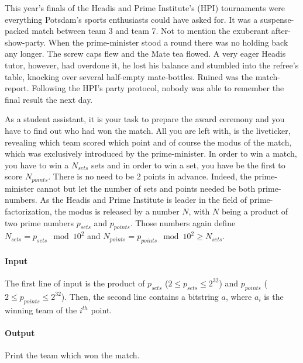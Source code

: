 



\makeheader

This year's finals of the Headis and Prime Institute's (HPI) tournaments were everything Potsdam's sports enthusiasts could have asked for.
It was a suspense-packed match between team 3 and team 7.
Not to mention the exuberant after-show-party.
When the prime-minister stood a round there was no holding back any longer.
The screw caps flew and the Mate tea flowed.
A very eager Headis tutor, however, had overdone it, he lost his balance and stumbled into the refree's table, knocking over several half-empty mate-bottles.
Ruined was the match-report.
Following the HPI's party protocol, nobody was able to remember the final result the next day.

As a student assistant, it is your task to prepare the award ceremony and you have to find out who had won the match.
All you are left with, is the liveticker, revealing which team scored which point and of course the modus of the match,
which was exclusively introduced by the prime-minister.
In order to win a match, you have to win a $N_{sets}$ sets and in order to win a set, you have be the first to score $N_{points}$.
There is no need to be 2 points in advance.
Indeed, the prime-minister cannot but let the number of sets and points needed be both prime-numbers.
As the Headis and Prime Institute is leader in the field of prime-factorization, the modus is released by a number $N$,
with $N$ being a product of two prime numbers $p_{sets}$ and $p_{points}$. Those numbers again define $N_{sets} =
p_{sets} \mod 10^{2}$ and $N_{points} = p_{points} \mod 10^{2} \geq N_{sets}$.

\paragraph*{Input}

The first line of input is the product of $p_{sets}$ ($2\leq p_{sets} \leq 2^{32}$) and $p_{points}$ ($2 \leq p_{points}
\leq 2^{32}$).
Then, the second line contains a bitstring $a$, where $a_i$ is the winning team of the $i^{th}$ point.

\paragraph*{Output}

Print the team which won the match.


\begin{samples}
\end{samples}


